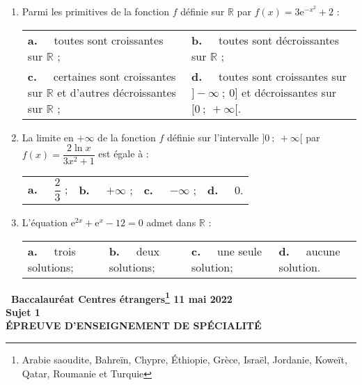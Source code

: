 \documentclass[10pt,a4paper]{article}
\newcommand{\R}{\mathbb{R}}
\begin{document}
\begin{enumerate}
\bigskip
\item Parmi les primitives de la fonction $f$ définie sur $\R$  par $f(x) = 3\text{e}^{-x^2} + 2$ :

\begin{center}
\begin{tabularx}{\linewidth}{*{2}{X}}
\textbf{a.~~} toutes sont croissantes sur $\R$ ;&\textbf{b.~~} toutes sont décroissantes sur $\R$ ;\\
\textbf{c.~~} certaines sont croissantes sur $\R$ et d'autres
décroissantes sur $\R$ ;& \textbf{d.~~} toutes sont croissantes sur $]-\infty~;~0]$ et
décroissantes sur $[0~;~+\infty[$.
\end{tabularx}
\end{center}

\item La limite en $+\infty$ de la fonction $f$ définie sur l'intervalle $]0~;~+\infty[$ par $f(x) = \dfrac{2\ln x}{3x^2 + 1}$ est égale à :

\begin{center}
\begin{tabularx}{\linewidth}{*{4}{X}}
\textbf{a.~~} $\dfrac23$ ;&\textbf{b.~~} $+ \infty$ ;&\textbf{c.~~} $- \infty$ ; &\textbf{d.~~} $0$.
\end{tabularx}
\end{center}

\item L'équation $\text{e}^{2x} + \text{e}^x - 12 = 0$ admet dans $\R$ :

\begin{center}
\begin{tabularx}{\linewidth}{*{4}{X}}
\textbf{a.~~} trois solutions; &\textbf{b.~~} deux solutions; &\textbf{c.~~} une seule solution;&\textbf{d.~~} aucune solution.
\end{tabularx}
\end{center}
\end{enumerate}

\newpage
\hypertarget{Centresetrangers1}{}

\label{Centresetrangers1}

\pagestyle{fancy}
\thispagestyle{empty}

\begin{center}{\Large\textbf{\decofourleft~Baccalauréat Centres étrangers\footnote{Arabie saoudite, Bahreïn, Chypre, Éthiopie, Grèce, Israël, Jordanie, Koweït, Qatar, Roumanie et Turquie} 11 mai 2022~\decofourright\\[7pt]  Sujet 1\\[7pt] ÉPREUVE D'ENSEIGNEMENT DE SPÉCIALITÉ}}
\end{center}
\end{document}
